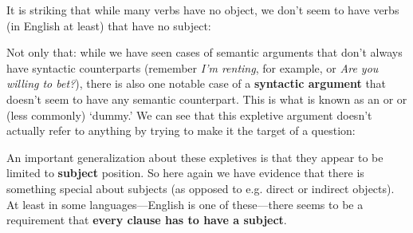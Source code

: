\documentclass{article}
\begin{document}
It is striking that while many verbs have no object, we don't seem to have verbs (in English at least) that have no subject:
\begin{exe}
\end{exe}
Not only that:  while we have seen cases of semantic arguments that don't always have syntactic counterparts (remember \emph{I'm renting}, for example, or \emph{Are you willing to bet?}), there is also one notable case of a \textbf{syntactic argument} that doesn't seem to have any semantic counterpart.
This is what is known as an  or  or (less commonly) `dummy.' We can see that this expletive argument doesn't actually refer to anything by trying to make it the target of a question:
\begin{exe}
    \begin{xlist}
    \end{xlist}
\end{exe}
An important generalization about these expletives is that they appear to be limited to \textbf{subject} position.
So here again we have evidence that there is something special about subjects (as opposed to e.g. direct or indirect objects).
At least in some languages---English is one of these---there seems to be a requirement that \textbf{every clause has to have a subject}.  
\end{document}
